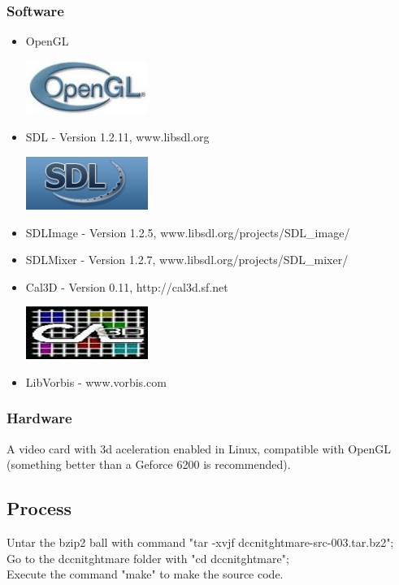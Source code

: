 \documentclass[ letterpaper,12pt]{article}
\begin{document}
\subsubsection{Software}
\begin{itemize}
\item{OpenGL  
  \begin{center}
  \includegraphics{opengl_logo.png}
  \end{center}
}
\item{SDL - Version 1.2.11, www.libsdl.org
\begin{center}
  \includegraphics{sdl.png}
  \end{center}
}
\item{SDLImage - Version 1.2.5, www.libsdl.org/projects/SDL\_image/}
\item{SDLMixer - Version 1.2.7, www.libsdl.org/projects/SDL\_mixer/}
\item{Cal3D - Version 0.11, http://cal3d.sf.net
\begin{center}
  \includegraphics{cal3dLogo.png}
  \end{center}
}
\item{LibVorbis - www.vorbis.com}
\end{itemize}

\subsubsection{Hardware}
A video card with 3d aceleration enabled in Linux, compatible with OpenGL (something better than a Geforce 6200 is recommended).

\subsection{Process}

Untar the bzip2 ball with command "tar -xvjf dccnitghtmare-src-003.tar.bz2";\\
Go to the dccnitghtmare folder with "cd dccnitghtmare";\\
Execute the command "make" to make the source code.
\end{document}
